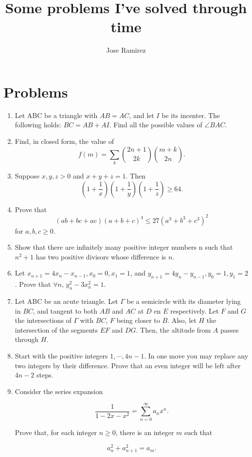 \documentclass{article}
\title{Some problems I've solved through time}
\author{Jose Ramirez}
\begin{document}
\maketitle

\section{Problems}
\label{sec:Problems}

\begin{enumerate}

\item Let ABC be a triangle with $AB=AC$, and let $I$  be its incenter. The following holds: $BC=AB+AI$. Find all the possible values of $\angle BAC$.

\item Find, in closed form, the value of $$f(m) = \sum_{k} \binom{2n + 1}{2k}\binom{m + k}{2n}.$$

\item Suppose $x, y, z > 0$ and $x + y + z = 1$. Then $$\left(1 + \frac{1}{x}\right)\left(1 + \frac{1}{y}\right)\left(1 + \frac{1}{z}\right) \geq 64.$$

\item Prove that $$(ab + bc + ac)(a + b + c)^4 \leq 27(a^3 + b^3 + c^3)^{2}$$ for $a, b, c \geq 0.$

\item Show that there are infinitely many positive integer numbers n such that $n^2 + 1$ has two positive divisors whose difference is $n$.

\item Let $x_{n + 1} = 4x_{n} - x_{n - 1}, x_0 = 0, x_1 = 1$, and $y_{n + 1} = 4y_{n} - y_{n - 1}, y_0 = 1, y_1 = 2$. Prove that $\forall n$, $y_{n}^2 - 3x_{n}^2 = 1$.

\item Let ABC be an acute triangle. Let $\Gamma$ be a semicircle with its diameter lying in $BC$, and tangent to both $AB$ and $AC$ at $D$ en $E$ respectively. Let $F$ and $G$ the intersections of $\Gamma$ with $BC$, $F$ being closer to $B$. Also, let $H$ the intersection of the segments $EF$ and $DG$. Then, the altitude from $A$ passes through $H$.

\item Start with the positive integers $1, \cdots, 4n - 1$. In one move you may replace any two integers by their difference. Prove that an even integer will be left after $4n - 2$ steps.

\item Consider the series expansion

$$\frac{1}{1 - 2x -x^2} = \sum_{n = 0}^{\infty}a_n x^n.$$

Prove that, for each integer $n \geq 0$, there is an integer $m$ such that

$$a_n^2 + a_{n + 1}^2 = a_m.$$

\end{enumerate}
\end{document}
